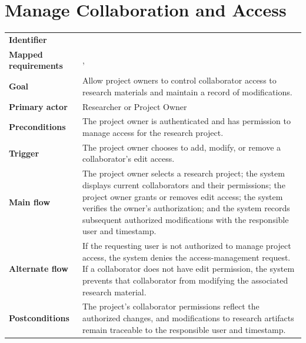 \section{Manage Collaboration and Access}
\begin{tabularx}{\linewidth}{L{3.5cm}Y}
\toprule
\textbf{Identifier} & \\
\textbf{Mapped requirements} & , \\
\textbf{Goal} & Allow project owners to control collaborator access to research materials and maintain a record of modifications.\\
\textbf{Primary actor} & Researcher or Project Owner\\
\textbf{Preconditions} & The project owner is authenticated and has permission to manage access for the research project.\\
\textbf{Trigger} & The project owner chooses to add, modify, or remove a collaborator's edit access.\\
\textbf{Main flow} & The project owner selects a research project; the system displays current collaborators and their permissions; the project owner grants or removes edit access; the system verifies the owner's authorization; and the system records subsequent authorized modifications with the responsible user and timestamp.\\
\textbf{Alternate flow} & If the requesting user is not authorized to manage project access, the system denies the access-management request. If a collaborator does not have edit permission, the system prevents that collaborator from modifying the associated research material.\\
\textbf{Postconditions} & The project's collaborator permissions reflect the authorized changes, and modifications to research artifacts remain traceable to the responsible user and timestamp.\\
\bottomrule
\end{tabularx}

